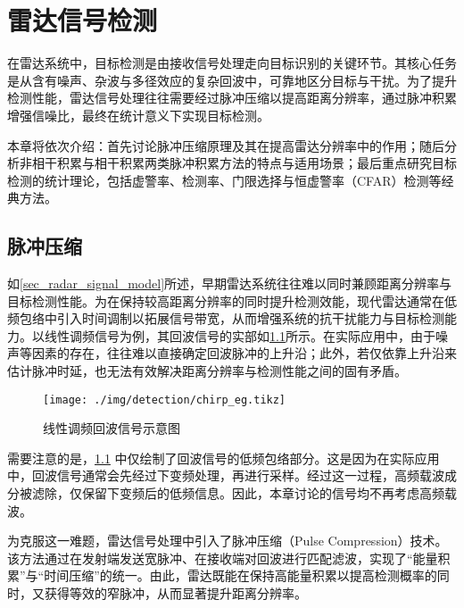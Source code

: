 \chapter{雷达信号检测}
在雷达系统中，目标检测是由接收信号处理走向目标识别的关键环节。其核心任务是从含有噪声、杂波与多径效应的复杂回波中，可靠地区分目标与干扰。为了提升检测性能，雷达信号处理往往需要经过脉冲压缩以提高距离分辨率，通过脉冲积累增强信噪比，最终在统计意义下实现目标检测。

本章将依次介绍：首先讨论脉冲压缩原理及其在提高雷达分辨率中的作用；随后分析非相干积累与相干积累两类脉冲积累方法的特点与适用场景；最后重点研究目标检测的统计理论，包括虚警率、检测率、门限选择与恒虚警率（CFAR）检测等经典方法。

\section{脉冲压缩}
如\cref{sec_radar_signal_model}所述，早期雷达系统往往难以同时兼顾距离分辨率与目标检测性能。为在保持较高距离分辨率的同时提升检测效能，现代雷达通常在低频包络中引入时间调制以拓展信号带宽，从而增强系统的抗干扰能力与目标检测能力。以线性调频信号为例，其回波信号的实部如\cref{fig_chirp_eg}所示。在实际应用中，由于噪声等因素的存在，往往难以直接确定回波脉冲的上升沿；此外，若仅依靠上升沿来估计脉冲时延，也无法有效解决距离分辨率与检测性能之间的固有矛盾。

\begin{figure}[htb!]
    \centering
    \texttt{[image: ./img/detection/chirp\_eg.tikz]}
    \caption{线性调频回波信号示意图}
    \label{fig_chirp_eg}
\end{figure}

需要注意的是，\cref{fig_chirp_eg} 中仅绘制了回波信号的低频包络部分。这是因为在实际应用中，回波信号通常会先经过下变频处理，再进行采样。经过这一过程，高频载波成分被滤除，仅保留下变频后的低频信息。因此，本章讨论的信号均不再考虑高频载波。

为克服这一难题，雷达信号处理中引入了脉冲压缩（Pulse Compression）技术。该方法通过在发射端发送宽脉冲、在接收端对回波进行匹配滤波，实现了``能量积累''与``时间压缩''的统一。由此，雷达既能在保持高能量积累以提高检测概率的同时，又获得等效的窄脉冲，从而显著提升距离分辨率。

